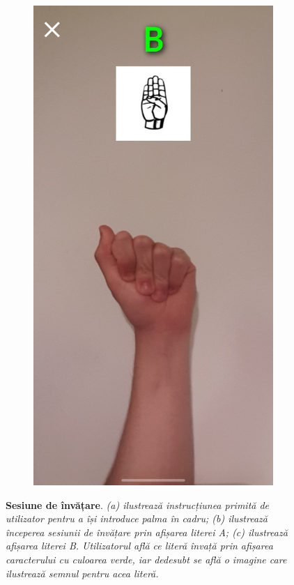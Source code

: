\begin{figure}[H]
\begin{subfigure}{0.2\textwidth}
  \caption{}
  \label{fig:learning_started}
  \end{subfigure}
   \begin{subfigure}{0.2\textwidth}
    \includegraphics[width=\textwidth]{images/3-aplicatia-android/learn_a_detected.jpeg}
  \caption{}
  \label{fig:first_letter_detected}
  \end{subfigure}
  \caption[Sesiune de învățare]{\textbf{Sesiune de învățare}. \textit{(a) ilustrează instrucțiunea primită de utilizator pentru a își introduce palma în cadru; (b) ilustrează începerea sesiunii de învățare prin afișarea literei A; (c) ilustrează afișarea literei B. Utilizatorul află ce literă învață prin afișarea caracterului cu culoarea verde, iar dedesubt se află o imagine care ilustrează semnul pentru acea literă.}}
  \label{fig:training_sesh_figs}
\end{figure}

